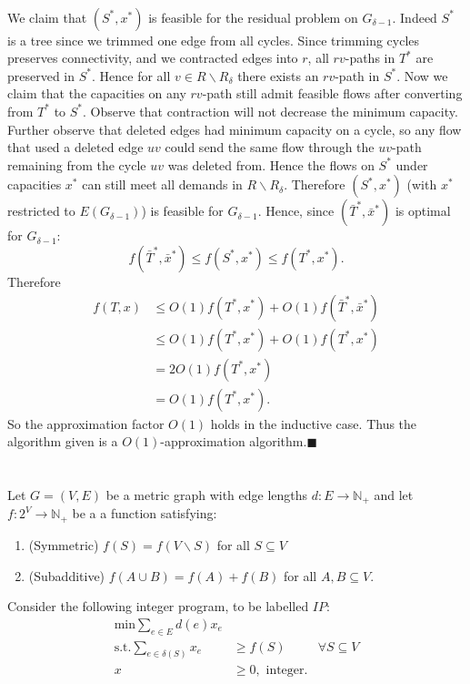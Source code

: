 \documentclass[letterpaper,12pt,oneside,onecolumn]{article}
\newcommand{\N}{\mathbb{N}} \newcommand{\R}{\mathbb{R}}
\begin{document}
\paragraph{}
We claim that $(S^*, x^*)$ is feasible for the residual problem on $G_{\delta-1}$. Indeed $S^*$ is a tree since we trimmed one edge from all cycles. Since trimming cycles preserves connectivity, and we contracted edges into $r$, all $rv$-paths in $T^*$ are preserved in $S^*$. Hence for all $v \in R\backslash R_\delta$ there exists an $rv$-path in $S^*$. Now we claim that the capacities on any $rv$-path still admit feasible flows after converting from $T^*$ to $S^*$. Observe that contraction will not decrease the minimum capacity. Further observe that deleted edges had minimum capacity on a cycle, so any flow that used a deleted edge $uv$ could send the same flow through the $uv$-path remaining from the cycle $uv$ was deleted from. Hence the flows on $S^*$ under capacities $x^*$ can still meet all demands in $R\backslash R_\delta$. Therefore $(S^*,x^*)$ (with $x^*$ restricted to $E(G_{\delta-1})$) is feasible for $G_{\delta -1}$. Hence, since $(\bar{T}^*, \bar{x}^*)$ is optimal for $G_{\delta -1}$:
$$f(\bar{T}^*, \bar{x}^*) \leq f(S^*, x^*) \leq f(T^*, x^*).$$
Therefore
\begin{align*}
f(T,x) &\leq O(1)f(T^*,x^*) + O(1)f(\bar{T}^*,\bar{x}^*) \\
&\leq O(1)f(T^*,x^*) + O(1)f(T^*,x^*) \\
&= 2O(1)f(T^*,x^*)\\
&= O(1)f(T^*,x^*).
\end{align*}
So the approximation factor $O(1)$ holds in the inductive case. Thus the algorithm given is a $O(1)$-approximation algorithm.$\blacksquare$

\section{}
\paragraph{}
Let $G=(V,E)$ be a metric graph with edge lengths $d: E \rightarrow \N_+$ and let $f : 2^V \rightarrow \N_+$  be a a function satisfying:
\begin{enumerate}
\item (Symmetric) $f(S) = f(V\backslash S)$ for all $S \subseteq V$
\item (Subadditive) $f(A \cup B) = f(A) + f(B)$ for all $A,B \subseteq V$.
\end{enumerate}
Consider the following integer program, to be labelled $IP$:
\begin{align*}
\text{min} \sum_{e \in E} d(e) x_e\\
\text{s.t.} \sum_{e\in \delta(S)} x_e &\geq f(S) &\forall S \subseteq V \\
x &\geq 0, \text{ integer}.
\end{align*}
\end{document}
